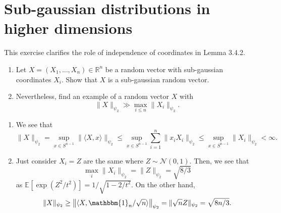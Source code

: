 \section{Sub-gaussian distributions in higher dimensions}
\begin{problem*}[Exercise 3.4.3]\label{ex3.4.3}
	This exercise clarifies the role of independence of coordinates in Lemma 3.4.2.
	\begin{enumerate}[1.]
		\item\label{ex3.4.3:1} Let \(X = (X_1, \dots , X_n) \in \mathbb{R} ^n\) be a random vector with sub-gaussian coordinates \(X_i\). Show that \(X\) is a sub-gaussian random vector.
		\item\label{ex3.4.3:2} Nevertheless, find an example of a random vector \(X\) with
		      \[
			      \lVert X \rVert _{\psi _2}
			      \gg \max _{i \leq n} \lVert X_i \rVert _{\psi _2}.
		      \]
	\end{enumerate}
\end{problem*}
\begin{answer}
	\begin{enumerate}[1.]
		\item We see that
		      \[
			      \lVert X \rVert _{\psi _2}
			      = \sup _{x \in S^{n-1}} \lVert \langle X, x \rangle  \rVert _{\psi _2}
			      \leq \sup _{x \in S^{n-1}} \sum_{i=1}^{n} \lVert x_i X_i \rVert _{\psi _2}
			      \leq \sup _{x \in S^{n-1}} \lVert X_i \rVert _{\psi _2}
			      < \infty .
		      \]
		\item Just consider \(X_i = Z\) are the same where \(Z \sim \mathcal{N} (0, 1)\). Then, we see that
		      \[
			      \max _{i} \lVert X_i \rVert _{\psi _2} = \lVert Z \rVert _{\psi _2} = \sqrt{8 / 3}
		      \]
		      as \(\mathbb{E}_{}[\exp (Z^2 / t^2)] = 1 / \sqrt{1 - 2 / t^2} \). On the other hand,
		      \[
			      \lVert X \rVert _{\psi _2}
			      \geq \left\lVert \langle X, \mathbbm{1}_{n} / \sqrt{n}  \rangle  \right\rVert _{\psi _2}
			      = \lVert \sqrt{n} Z \rVert _{\psi _2}
			      = \sqrt{8n / 3}.
		      \]
	\end{enumerate}
\end{answer}


